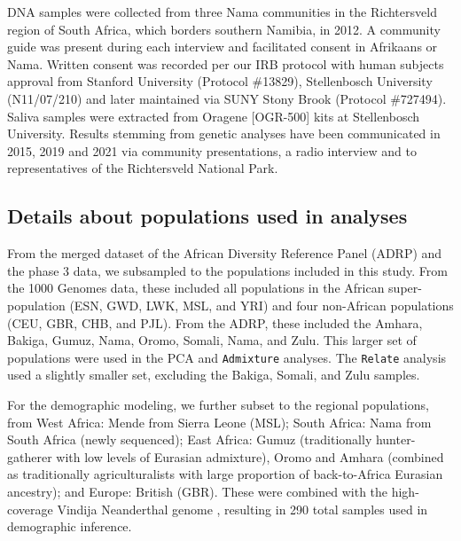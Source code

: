 \documentclass[]{article}
\begin{document}
DNA samples were collected from three Nama communities in the Richtersveld
region of South Africa, which borders southern Namibia, in 2012. A community
guide was present during each interview and facilitated consent in Afrikaans or
Nama. Written consent was recorded per our IRB protocol with human subjects
approval from Stanford University (Protocol \#13829), Stellenbosch University
(N11/07/210) and later maintained via SUNY Stony Brook (Protocol \#727494).
Saliva samples were extracted from Oragene [OGR-500] kits at Stellenbosch
University. Results stemming from genetic analyses have been communicated in
2015, 2019 and 2021 via community presentations, a radio interview and to
representatives of the Richtersveld National Park.

\subsection{Details about populations used in analyses}

From the merged dataset of the African Diversity Reference Panel (ADRP)
\citep{Gurdasani2015-qy,Pagani2015-pz}
and the \citet{1000_Genomes_Project_Consortium2015-zq} phase 3 data,
we subsampled to the populations included in this study. From the 1000 Genomes
data, these included all populations in the African super-population (ESN, GWD,
LWK, MSL, and YRI) and four non-African populations (CEU, GBR, CHB, and PJL).
From the ADRP, these included the Amhara, Bakiga, Gumuz, Nama, Oromo, Somali,
Nama, and Zulu. This larger set of populations were used in the PCA and
\texttt{Admixture} analyses. The \texttt{Relate} analysis used a slightly
smaller set, excluding the Bakiga, Somali, and Zulu samples.

For the demographic modeling, we further subset to the regional populations,
from West Africa: Mende from Sierra Leone (MSL); South Africa: Nama from South
Africa (newly sequenced); East Africa: Gumuz (traditionally hunter-gatherer
with low levels of Eurasian admixture), Oromo and Amhara (combined as
traditionally agriculturalists with large proportion of back-to-Africa Eurasian
ancestry); and Europe: British (GBR). These were combined with the
high-coverage Vindija Neanderthal genome \citep{Prufer2017-kk}, resulting in 290
total samples used in demographic inference.
\end{document}
